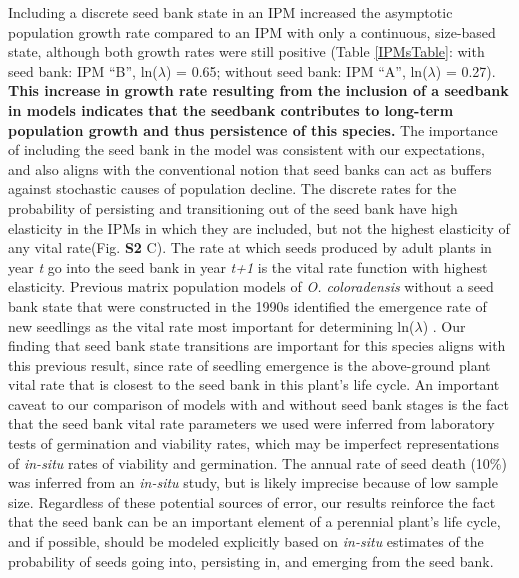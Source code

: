 \documentclass[12pt, letterpaper]{article}
\begin{document}
Including a discrete seed bank state in an IPM increased the asymptotic population growth rate compared to an IPM with only a continuous, size-based state, although both growth rates were still positive (Table \ref{IPMsTable}: with seed bank: IPM “B”, ln($\lambda$) = 0.65; without seed bank: IPM “A”, ln($\lambda$) = 0.27). \textbf{This increase in growth rate resulting from the inclusion of a seedbank in models indicates that the seedbank contributes to long-term population growth and thus persistence of this species.} The importance of including the seed bank in the model was consistent with our expectations, and also aligns with the conventional notion that seed banks can act as buffers against stochastic causes of population decline. The discrete rates for the probability of persisting and transitioning out of the seed bank have high elasticity in the IPMs in which they are included, but not the highest elasticity of any vital rate(Fig. \textbf{S2} C). The rate at which seeds produced by adult plants in year \textit{t} go into the seed bank in year \textit{t+1} is the vital rate function with highest elasticity. Previous matrix population models of \textit{O. coloradensis} without a seed bank state that were constructed in the 1990s identified the emergence rate of new seedlings as the vital rate most important for determining ln($\lambda$) \cite{Floyd1998}. Our finding that seed bank state transitions are important for this species aligns with this previous result, since rate of seedling emergence is the above-ground plant vital rate that is closest to the seed bank in this plant’s life cycle. An important caveat to our comparison of models with and without seed bank stages is the fact that the seed bank vital rate parameters we used were inferred from laboratory tests of germination and viability rates, which may be imperfect representations of \textit{in-situ} rates of viability and germination. The annual rate of seed death (10\%) was inferred from an \textit{in-situ} study, but is likely imprecise because of low sample size. Regardless of these potential sources of error, our results reinforce the fact that the seed bank can be an important element of a perennial plant’s life cycle, and if possible, should be modeled explicitly based on \textit{in-situ} estimates of the probability of seeds going into, persisting in, and emerging from the seed bank.      
\end{document}
